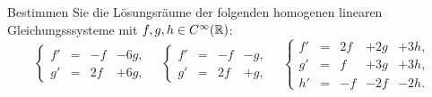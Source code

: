 \documentclass[a4paper,10pt]{scrartcl}
\begin{document}
\begin{question}
  Bestimmen Sie die Lösungsräume der folgenden homogenen linearen Gleichungsssysteme mit $f, g, h \in C^\infty(\mathbb{R})$:
  \[
    \left\{
      \begin{array}{ccrr}
        f'  & = & -f  & - 6g, \\
        g'  & = & 2f  & + 6g,
      \end{array}
    \right.
    \quad
    \left\{
      \begin{array}{ccrr}
        f'  & = & -f  & - g,  \\
        g'  & = & 2f  & + g,
      \end{array}
    \right.
    \quad
    \left\{
      \begin{array}{ccrrr}
        f'  & = & 2f  & + 2g  & + 3h, \\
        g'  & = &  f  & + 3g  & + 3h, \\
        h'  & = & -f  & - 2f  & - 2h.
      \end{array}
    \right.
  \]
\end{question}
\end{document}
